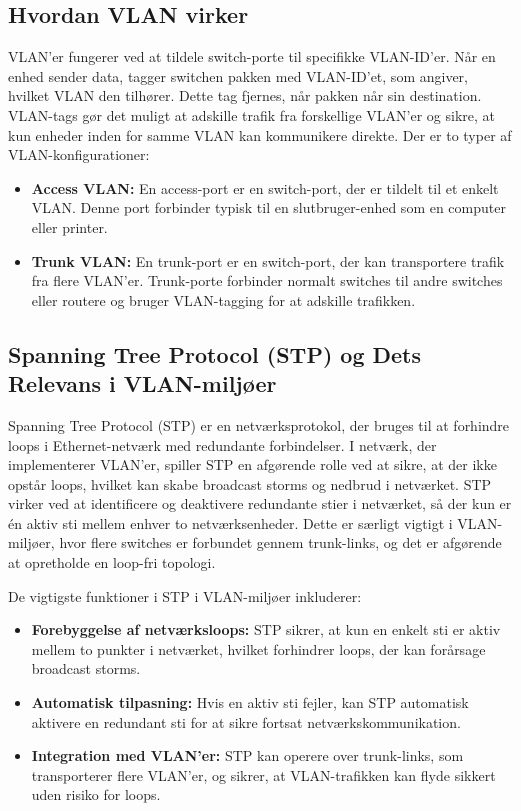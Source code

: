 \subsection{Hvordan VLAN virker}
VLAN'er fungerer ved at tildele switch-porte til specifikke VLAN-ID'er. Når en enhed sender data, tagger switchen pakken med VLAN-ID'et, som angiver, hvilket VLAN den tilhører. Dette tag fjernes, når pakken når sin destination. VLAN-tags gør det muligt at adskille trafik fra forskellige VLAN'er og sikre, at kun enheder inden for samme VLAN kan kommunikere direkte.
\newline
\newline
\noindent Der er to typer af VLAN-konfigurationer:
\begin{itemize}
	\item \textbf{Access VLAN:} En access-port er en switch-port, der er tildelt til et enkelt VLAN. Denne port forbinder typisk til en slutbruger-enhed som en computer eller printer.
	\item \textbf{Trunk VLAN:} En trunk-port er en switch-port, der kan transportere trafik fra flere VLAN'er. Trunk-porte forbinder normalt switches til andre switches eller routere og bruger VLAN-tagging for at adskille trafikken.
\end{itemize}

\subsection{Spanning Tree Protocol (STP) og Dets Relevans i VLAN-miljøer}
Spanning Tree Protocol (STP) er en netværksprotokol, der bruges til at forhindre loops i Ethernet-netværk med redundante forbindelser. I netværk, der implementerer VLAN'er, spiller STP en afgørende rolle ved at sikre, at der ikke opstår loops, hvilket kan skabe broadcast storms og nedbrud i netværket.
\newline\newline
\noindent STP virker ved at identificere og deaktivere redundante stier i netværket, så der kun er én aktiv sti mellem enhver to netværksenheder. Dette er særligt vigtigt i VLAN-miljøer, hvor flere switches er forbundet gennem trunk-links, og det er afgørende at opretholde en loop-fri topologi.

\noindent De vigtigste funktioner i STP i VLAN-miljøer inkluderer:
\begin{itemize}
	\item \textbf{Forebyggelse af netværksloops:} STP sikrer, at kun en enkelt sti er aktiv mellem to punkter i netværket, hvilket forhindrer loops, der kan forårsage broadcast storms.
	\item \textbf{Automatisk tilpasning:} Hvis en aktiv sti fejler, kan STP automatisk aktivere en redundant sti for at sikre fortsat netværkskommunikation.
	\item \textbf{Integration med VLAN'er:} STP kan operere over trunk-links, som transporterer flere VLAN'er, og sikrer, at VLAN-trafikken kan flyde sikkert uden risiko for loops.
\end{itemize}

